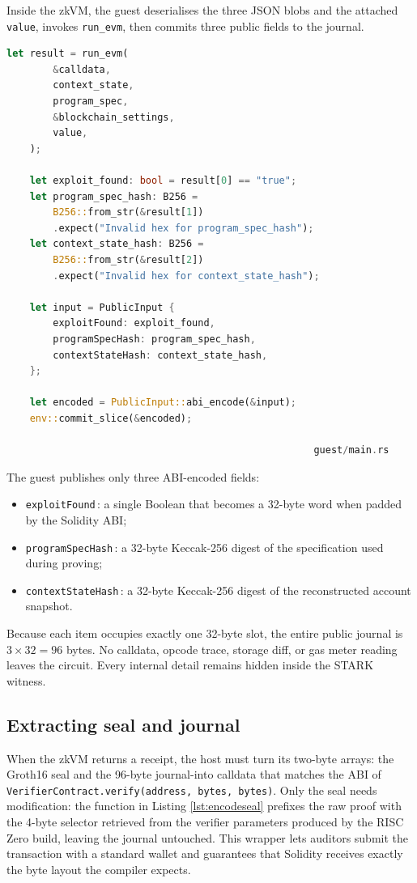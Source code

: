 Inside the zkVM, the guest deserialises the three JSON blobs and the attached \texttt{value}, invokes \texttt{run\_evm}, then commits three public fields to the journal.

\begin{lstlisting}[caption={[Main entry point of the guest]},label={lst:guest_main},language=Rust]
    let result = run_evm(
        &calldata,
        context_state,
        program_spec,
        &blockchain_settings,
        value,
    );  

    let exploit_found: bool = result[0] == "true";
    let program_spec_hash: B256 =
        B256::from_str(&result[1])
        .expect("Invalid hex for program_spec_hash");
    let context_state_hash: B256 =
        B256::from_str(&result[2])
        .expect("Invalid hex for context_state_hash");

    let input = PublicInput {
        exploitFound: exploit_found,
        programSpecHash: program_spec_hash,
        contextStateHash: context_state_hash,
    };

    let encoded = PublicInput::abi_encode(&input);
    env::commit_slice(&encoded);

                                                     guest/main.rs
\end{lstlisting}

The guest publishes only three ABI-encoded fields:

\begin{itemize}
  \item \texttt{exploitFound}\,: a single Boolean that becomes a 32-byte word when padded by the Solidity ABI;
  \item \texttt{programSpecHash}\,: a 32-byte Keccak-256 digest of the specification used during proving;
  \item \texttt{contextStateHash}\,: a 32-byte Keccak-256 digest of the reconstructed account snapshot.
\end{itemize}

Because each item occupies exactly one 32-byte slot, the entire public journal
is \(3 \times 32 = 96\) bytes. No calldata, opcode trace, storage diff, or gas meter reading leaves the circuit. Every internal detail remains hidden inside the STARK witness.

\subsection{Extracting seal and journal}

When the zkVM returns a receipt, the host must turn its two-byte arrays: the Groth16 seal and the 96-byte journal-into calldata that matches the ABI of \texttt{VerifierContract.verify(address, bytes, bytes)}. Only the seal needs modification: the function in Listing \ref{lst:encodeseal} prefixes the raw proof with the 4-byte selector retrieved from the verifier parameters produced by the RISC Zero build, leaving the journal untouched. This wrapper lets auditors submit the transaction with a standard wallet and guarantees that Solidity receives exactly the byte layout the compiler expects.

